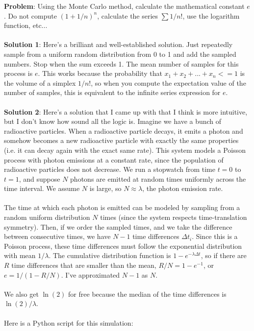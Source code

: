 \documentclass[a4paper,12pt]{article}
\begin{document}
\textbf{Problem}: Using the Monte Carlo method, calculate the mathematical constant $e$. Do not compute $(1+1/n)^n$, calculate the series $\sum{1/n!}$, use the logarithm function, etc...
\\ \\
\textbf{Solution 1}: Here's a brilliant and well-established solution. Just repeatedly sample from a uniform random distribution from 0 to 1 and add the sampled numbers. Stop when the sum exceeds 1. The mean number of samples for this process is $e$. This works because the probability that $x_1 + x_2 + ... + x_n <= 1$ is the volume of a simplex $1/n!$, so when you compute the expectation value of the number of samples, this is equivalent to the infinite series expression for $e$.
\\ \\
\textbf{Solution 2}: Here's a solution that I came up with that I think is more intuitive, but I don't know how sound all the logic is. Imagine we have a bunch of radioactive particles. When a radioactive particle decays, it emits a photon and somehow becomes a new radioactive particle with exactly the same properties (i.e. it can decay again with the exact same rate). This system models a Poisson process with photon emissions at a constant rate, since the population of radioactive particles does not decrease. We run a stopwatch from time $t=0$ to $t=1$, and suppose $N$ photons are emitted at random times uniformly across the time interval. We assume $N$ is large, so $N \approx \lambda$, the photon emission rate.
\\ \\
The time at which each photon is emitted can be modeled by sampling from a random uniform distribution $N$ times (since the system respects time-translation symmetry). Then, if we order the sampled times, and we take the difference between consecutive times, we have $N-1$ time differences $\Delta t_i$. Since this is a Poisson process, these time differences must follow the exponential distribution with mean $1/\lambda$. The cumulative distribution function is $1-e^{-\lambda \Delta t}$, so if there are $R$ time differences that are smaller than the mean, $R/N = 1 - e^{-1}$, or $e = 1/(1 - R/N)$.  I've approximated $N-1$ as $N$.
 \\ \\
We also get $\ln(2)$ for free because the median of the time differences is $\ln(2)/\lambda$.
\\ \\
Here is a Python script for this simulation:
\end{document}
